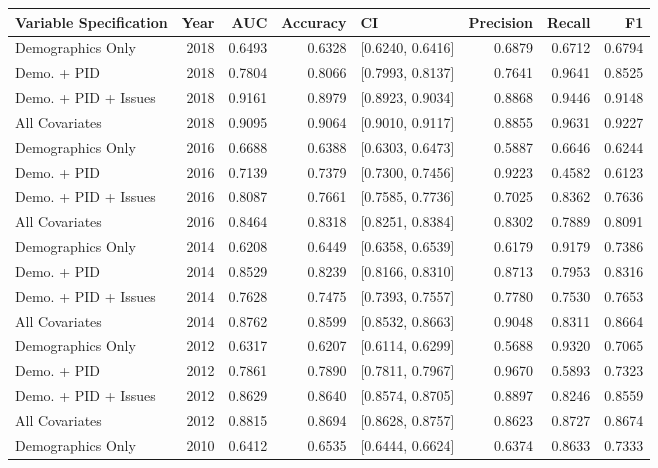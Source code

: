 \begin{table}[H]
\centering
\begin{tabular}{lrrrlrrr}
  \toprule
Variable Specification & Year & AUC & Accuracy & CI & Precision & Recall & F1 \\ 
  \midrule
Demographics Only & 2018 & 0.6493 & 0.6328 & [0.6240, 0.6416] & 0.6879 & 0.6712 & 0.6794 \\ 
  Demo. + PID & 2018 & 0.7804 & 0.8066 & [0.7993, 0.8137] & 0.7641 & 0.9641 & 0.8525 \\ 
  Demo. + PID + Issues & 2018 & 0.9161 & 0.8979 & [0.8923, 0.9034] & 0.8868 & 0.9446 & 0.9148 \\ 
  All Covariates & 2018 & 0.9095 & 0.9064 & [0.9010, 0.9117] & 0.8855 & 0.9631 & 0.9227 \\ 
  Demographics Only & 2016 & 0.6688 & 0.6388 & [0.6303, 0.6473] & 0.5887 & 0.6646 & 0.6244 \\ 
  Demo. + PID & 2016 & 0.7139 & 0.7379 & [0.7300, 0.7456] & 0.9223 & 0.4582 & 0.6123 \\ 
  Demo. + PID + Issues & 2016 & 0.8087 & 0.7661 & [0.7585, 0.7736] & 0.7025 & 0.8362 & 0.7636 \\ 
  All Covariates & 2016 & 0.8464 & 0.8318 & [0.8251, 0.8384] & 0.8302 & 0.7889 & 0.8091 \\ 
  Demographics Only & 2014 & 0.6208 & 0.6449 & [0.6358, 0.6539] & 0.6179 & 0.9179 & 0.7386 \\ 
  Demo. + PID & 2014 & 0.8529 & 0.8239 & [0.8166, 0.8310] & 0.8713 & 0.7953 & 0.8316 \\ 
  Demo. + PID + Issues & 2014 & 0.7628 & 0.7475 & [0.7393, 0.7557] & 0.7780 & 0.7530 & 0.7653 \\ 
  All Covariates & 2014 & 0.8762 & 0.8599 & [0.8532, 0.8663] & 0.9048 & 0.8311 & 0.8664 \\ 
  Demographics Only & 2012 & 0.6317 & 0.6207 & [0.6114, 0.6299] & 0.5688 & 0.9320 & 0.7065 \\ 
  Demo. + PID & 2012 & 0.7861 & 0.7890 & [0.7811, 0.7967] & 0.9670 & 0.5893 & 0.7323 \\ 
  Demo. + PID + Issues & 2012 & 0.8629 & 0.8640 & [0.8574, 0.8705] & 0.8897 & 0.8246 & 0.8559 \\ 
  All Covariates & 2012 & 0.8815 & 0.8694 & [0.8628, 0.8757] & 0.8623 & 0.8727 & 0.8674 \\ 
  Demographics Only & 2010 & 0.6412 & 0.6535 & [0.6444, 0.6624] & 0.6374 & 0.8633 & 0.7333 \\ 

\end{tabular}
\end{table}
